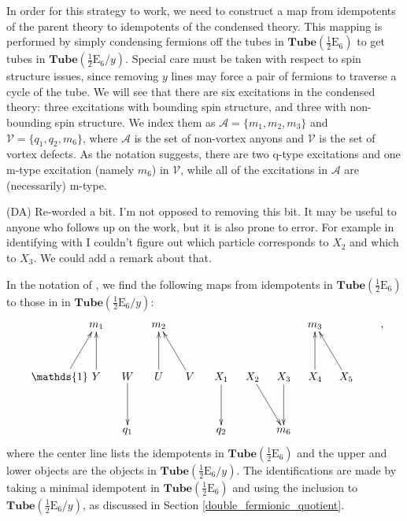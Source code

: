 \documentclass[12pt,a4paper]{article}
\newcommand{\mca}{\mathcal{A}}
\newcommand{\mcv}{\mathcal{V}}
\newcommand{\tube}{\textbf{Tube}}
\newcommand{\kw}[1]{{\color{kwcolor}\footnotesize{(KW) #1}}}
\newcommand{\dave}[1]{{\color{ao(english)}\footnotesize{(DA) #1}}}
\newcommand{\halfesix}{\frac{1}{2}\text{E}_6}
\begin{document}
In order for this strategy to work, we need to construct a map from idempotents of the parent theory to idempotents of the condensed theory.
This mapping is performed by simply condensing fermions off the tubes in $\tube(\halfesix)$ to get tubes in $\tube(\halfesix / y)$. 
Special care must be taken with respect to spin structure issues, since removing $y$ lines may force a pair of fermions to traverse a cycle of the tube. 
We will see that there are six excitations in the condensed theory: three excitations 
with bounding spin structure, and three with non-bounding spin structure. 
We index them as $\mca = \{ m_1, m_2, m_3\}$ and $\mcv = \{ q_1, q_2, m_6 \}$, 
where $\mca$ is the set of non-vortex anyons and $\mcv$ is the set of vortex defects. 
As the notation suggests, there are two q-type excitations and one m-type excitation 
(namely $m_6$) in $\mcv$, while all of the excitations in $\mca$ are (necessarily) m-type. 


\dave{Re-worded a bit. 
I'm not opposed to removing this bit. 
It may be useful to anyone who follows up on the work, 
but it is also prone to error.
For example in identifying with \cite{Hong2008} I couldn't figure out which particle corresponds to $X_2$ and which to $X_3$.
We could add a remark about that.
}

In the notation of \cite{Hong2008}, we find the following maps from idempotents in $\tube(\halfesix)$ to those in in $\tube(\halfesix / y)$:
\begin{align}
\xymatrix @!0 @M=1mm @C=10mm{
& &m_1 && m_2 && &&& m_3 &&  \\
 \\
 \quad&\mathds{1} \ar[ruu] \quad & Y \ar[uu] & W\ar[dd] & U\ar[uu] & V \ar[uul] & X_1 \ar[dd] & X_{2}\ar[ddr] &X_{3} \ar[dd] & X_4\ar[uu] & X_5\ar[uul] &  \\
\\
&&&q_1& &&q_2 &&m_6& &&  \\
},
\end{align}
where the center line lists the idempotents in $\tube(\halfesix)$ and the upper and lower objects are the objects in $\tube(\halfesix / y)$.
The identifications are made by taking a minimal idempotent in $\tube(\halfesix)$ and using the inclusion to $\tube(\halfesix/y)$, 
as discussed in Section \ref{double_fermionic_quotient}.
\end{document}
